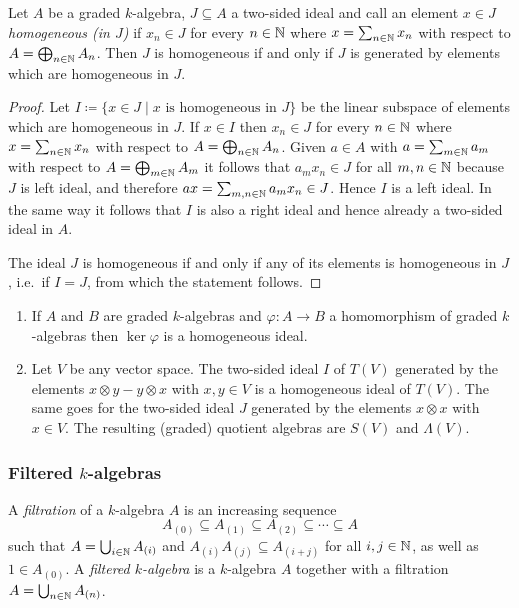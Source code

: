 \begin{lem}
 Let $A$ be a graded $k$-algebra, $J \subseteq A$ a two-sided ideal and call an element $x \in J$ \emph{homogeneous (in $J$)} if $x_n \in J$ for every $n \in \mathbb{N}$ where $x = \sum_{n \in \mathbb{N}} x_n$ with respect to $A = \bigoplus_{n \in \mathbb{N}} A_n$. Then $J$ is homogeneous if and only if $J$ is generated by elements which are homogeneous in $J$.
\end{lem}
\begin{proof}
 Let $I \coloneqq \{x \in J \mid \text{$x$ is homogeneous in $J$}\}$ be the linear subspace of elements which are homogeneous in $J$. If $x \in I$ then $x_n \in J$ for every $n \in \mathbb{N}$ where $x = \sum_{n \in \mathbb{N}} x_n$ with respect to $A = \bigoplus_{n \in \mathbb{N}} A_n$. Given $a \in A$ with $a = \sum_{m \in \mathbb{N}} a_m$ with respect to $A = \bigoplus_{m \in \mathbb{N}} A_m$ it follows that $a_m x_n \in J$ for all $m,n \in \mathbb{N}$ because $J$ is left ideal, and therefore $ax = \sum_{m,n \in \mathbb{N}} a_m x_n \in J$. Hence $I$ is a left ideal. In the same way it follows that $I$ is also a right ideal and hence already a two-sided ideal in $A$.
 
 The ideal $J$ is homogeneous if and only if any of its elements is homogeneous in $J$, i.e.\ if $I = J$, from which the statement follows.
\end{proof}


\begin{expls}
 \begin{enumerate}[leftmargin=*]
  \item
   If $A$ and $B$ are graded $k$-algebras and $\varphi \colon A \to B$ a homomorphism of graded $k$-algebras then $\ker \varphi$ is a homogeneous ideal.
  \item
   Let $V$ be any vector space. The two-sided ideal $I$ of $T(V)$ generated by the elements $x \otimes y - y \otimes x$ with $x,y \in V$ is a homogeneous ideal of $T(V)$. The same goes for the two-sided ideal $J$ generated by the elements $x \otimes x$ with $x \in V$. The resulting (graded) quotient algebras are $S(V)$ and $\Lambda(V)$.
 \end{enumerate}
\end{expls}



\subsubsection{Filtered $k$-algebras}


\begin{defi}
 A \emph{filtration} of a $k$-algebra $A$ is an increasing sequence
 \[
  A_{(0)}
  \subseteq A_{(1)}
  \subseteq A_{(2)}
  \subseteq \dotsb
  \subseteq A
 \]
 such that $A = \bigcup_{i \in \mathbb{N}} A_{(i)}$ and $A_{(i)} A_{(j)} \subseteq A_{(i+j)}$ for all $i,j \in \mathbb{N}$, as well as $1 \in A_{(0)}$. A \emph{filtered $k$-algebra} is a $k$-algebra $A$ together with a filtration $A = \bigcup_{n \in \mathbb{N}} A_{(n)}$.
\end{defi}


